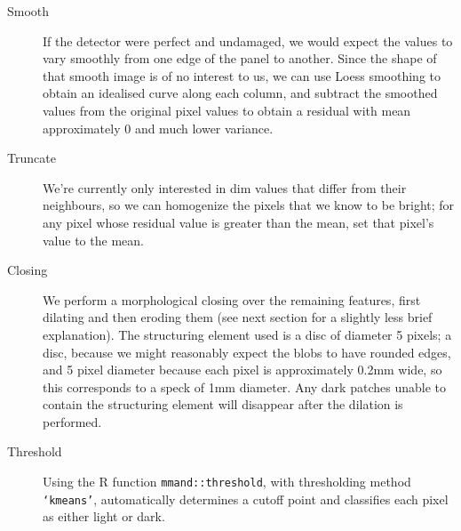 \documentclass[10pt,fleqn]{article}
\begin{document}
\begin{description}

\item[Smooth] If the detector were perfect and undamaged, we would expect the values to vary smoothly from one edge of the panel to another. Since the shape of that smooth image is of no interest to us, we can use Loess smoothing to obtain an idealised curve along each column, and subtract the smoothed values from the original pixel values to obtain a residual with mean approximately 0 and much lower variance.

\item[Truncate] We're currently only interested in dim values that differ from their neighbours, so we can homogenize the pixels that we know to be bright; for any pixel whose residual value is greater than the mean, set that pixel's value to the mean.

\item[Closing] We perform a morphological closing over the remaining features, first dilating and then eroding them (see next section for a slightly less brief explanation). The structuring element used is a disc of diameter 5 pixels; a disc, because we might reasonably expect the blobs to have rounded edges, and 5 pixel diameter because each pixel is approximately 0.2mm wide, so this corresponds to a speck of 1mm diameter. Any dark patches unable to contain the structuring element will disappear after the dilation is performed. 

\item[Threshold] Using the R function \texttt{mmand::threshold}, with thresholding method \texttt{`kmeans'}, automatically determines a cutoff point and classifies each pixel as either light or dark.

\end{description}
\end{document}

